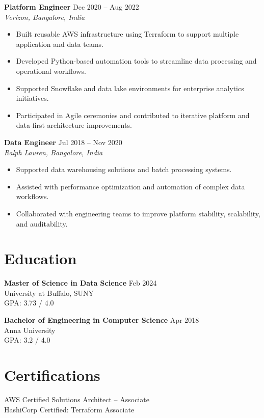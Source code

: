 \documentclass[10pt]{article} %
\begin{document}
\textbf{Platform Engineer} \hfill Dec 2020 -- Aug 2022 \\ %
\textit{Verizon, Bangalore, India}
\begin{itemize}[leftmargin=*, itemsep=3pt]
    \item Built reusable AWS infrastructure using Terraform to support multiple application and data teams. %
    \item Developed Python-based automation tools to streamline data processing and operational workflows. %
    \item Supported Snowflake and data lake environments for enterprise analytics initiatives. %
    \item Participated in Agile ceremonies and contributed to iterative platform and data-first architecture improvements. %
\end{itemize}

\textbf{Data Engineer} \hfill Jul 2018 -- Nov 2020 \\ %
\textit{Ralph Lauren, Bangalore, India}
\begin{itemize}[leftmargin=*, itemsep=3pt]
    \item Supported data warehousing solutions and batch processing systems. %
    \item Assisted with performance optimization and automation of complex data workflows. %
    \item Collaborated with engineering teams to improve platform stability, scalability, and auditability. %
\end{itemize}

\section*{Education}

\textbf{Master of Science in Data Science} \hfill Feb 2024 \\
University at Buffalo, SUNY \\
GPA: 3.73 / 4.0

\textbf{Bachelor of Engineering in Computer Science} \hfill Apr 2018 \\
Anna University \\
GPA: 3.2 / 4.0

\section*{Certifications}
AWS Certified Solutions Architect – Associate \\
HashiCorp Certified: Terraform Associate
\end{document}
